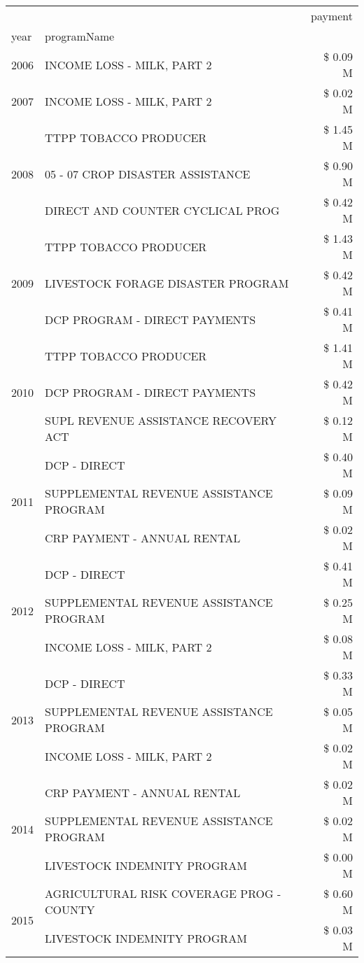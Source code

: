 \begin{tabular}{llr}
\toprule
 &  & payment \\
year & programName &  \\
\midrule
2006 & INCOME LOSS - MILK, PART 2 & \$ 0.09 M \\
\cline{1-3}
2007 & INCOME LOSS - MILK, PART 2 & \$ 0.02 M \\
\cline{1-3}
\multirow[t]{3}{*}{2008} & TTPP TOBACCO PRODUCER & \$ 1.45 M \\
 & 05 - 07 CROP DISASTER ASSISTANCE & \$ 0.90 M \\
 & DIRECT AND COUNTER CYCLICAL PROG & \$ 0.42 M \\
\cline{1-3}
\multirow[t]{3}{*}{2009} & TTPP TOBACCO PRODUCER & \$ 1.43 M \\
 & LIVESTOCK FORAGE DISASTER  PROGRAM & \$ 0.42 M \\
 & DCP PROGRAM - DIRECT PAYMENTS & \$ 0.41 M \\
\cline{1-3}
\multirow[t]{3}{*}{2010} & TTPP TOBACCO PRODUCER & \$ 1.41 M \\
 & DCP PROGRAM - DIRECT PAYMENTS & \$ 0.42 M \\
 & SUPL REVENUE ASSISTANCE RECOVERY ACT & \$ 0.12 M \\
\cline{1-3}
\multirow[t]{3}{*}{2011} & DCP - DIRECT & \$ 0.40 M \\
 & SUPPLEMENTAL REVENUE ASSISTANCE PROGRAM & \$ 0.09 M \\
 & CRP PAYMENT - ANNUAL RENTAL & \$ 0.02 M \\
\cline{1-3}
\multirow[t]{3}{*}{2012} & DCP - DIRECT & \$ 0.41 M \\
 & SUPPLEMENTAL REVENUE ASSISTANCE PROGRAM & \$ 0.25 M \\
 & INCOME LOSS - MILK, PART 2 & \$ 0.08 M \\
\cline{1-3}
\multirow[t]{3}{*}{2013} & DCP - DIRECT & \$ 0.33 M \\
 & SUPPLEMENTAL REVENUE ASSISTANCE PROGRAM & \$ 0.05 M \\
 & INCOME LOSS - MILK, PART 2 & \$ 0.02 M \\
\cline{1-3}
\multirow[t]{3}{*}{2014} & CRP PAYMENT - ANNUAL RENTAL & \$ 0.02 M \\
 & SUPPLEMENTAL REVENUE ASSISTANCE PROGRAM & \$ 0.02 M \\
 & LIVESTOCK INDEMNITY PROGRAM & \$ 0.00 M \\
\cline{1-3}
\multirow[t]{3}{*}{2015} & AGRICULTURAL RISK COVERAGE PROG - COUNTY & \$ 0.60 M \\
 & LIVESTOCK INDEMNITY PROGRAM & \$ 0.03 M \\

\end{tabular}
